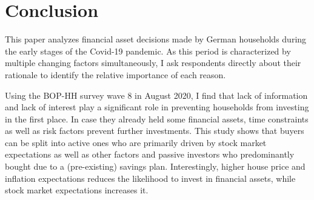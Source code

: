 \documentclass[ProjectABM]{subfiles}
\begin{document}

\section{Conclusion}\label{sec:conclusion} 
This paper analyzes financial asset decisions made by German households during the early stages of the Covid-19 pandemic. As this period is characterized by multiple changing factors simultaneously, I ask respondents directly about their rationale to identify the relative importance of each reason. 

Using the BOP-HH survey wave 8 in August 2020, I find that lack of information and lack of interest play a significant role in preventing households from investing in the first place. In case they already held some financial assets, time constraints as well as risk factors prevent further investments. This study shows that buyers can be split into active ones who are primarily  driven by stock market expectations as well as other factors and passive investors who predominantly bought due to a (pre-existing) savings plan. Interestingly, higher house price and inflation expectations reduces the likelihood to invest in financial assets, while stock market expectations increases it.

\end{document}
